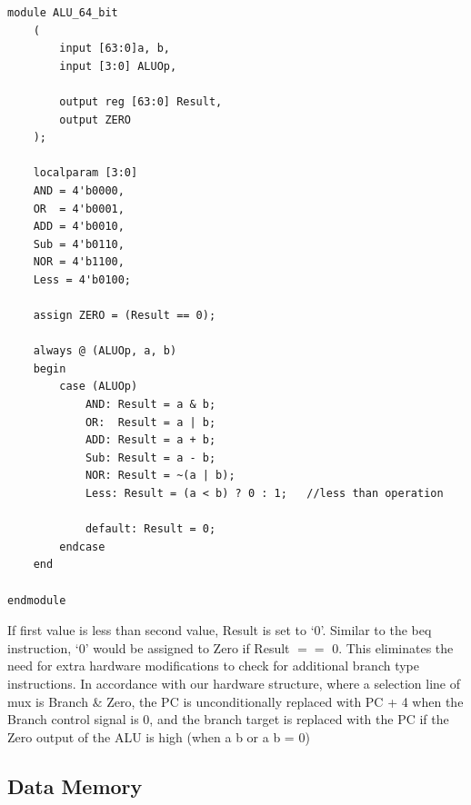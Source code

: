 \documentclass{article}
\begin{document}
\begin{lstlisting}[caption={Changes to ALU 64 bit}, captionpos=b, language=RISC-V]
module ALU_64_bit
    (
        input [63:0]a, b,
        input [3:0] ALUOp,
        
        output reg [63:0] Result,
        output ZERO
    );

    localparam [3:0]
    AND = 4'b0000,
    OR	= 4'b0001,
    ADD	= 4'b0010,
    Sub	= 4'b0110,
    NOR = 4'b1100,
    Less = 4'b0100;

    assign ZERO = (Result == 0);

    always @ (ALUOp, a, b)
    begin
        case (ALUOp)
            AND: Result = a & b;
            OR:	 Result = a | b;
            ADD: Result = a + b;
            Sub: Result = a - b;
            NOR: Result = ~(a | b);
            Less: Result = (a < b) ? 0 : 1;   //less than operation
            
            default: Result = 0;
        endcase
    end

endmodule
\end{lstlisting}

If first value is less than second value, Result is set to `0'. Similar to the beq instruction, `0' would be assigned to Zero if Result $ == $ 0. This eliminates the need for extra hardware modifications to check for additional branch type instructions. In accordance with our hardware structure, where a selection line of mux is Branch \& Zero, the PC is unconditionally replaced with PC + 4 when the Branch control signal is 0, and the branch target is replaced with the PC if the Zero output of the ALU is high (when a b or a b = 0)

\subsection{Data Memory}
\end{document}
